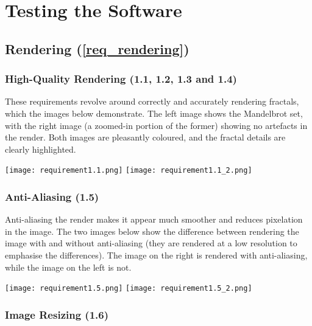 \section{Testing the Software}

\subsection{Rendering (\ref{req_rendering})}

\subsubsection{High-Quality Rendering (1.1, 1.2, 1.3 and 1.4)}

These requirements revolve around correctly and accurately rendering fractals, which the images below demonstrate. The left image shows the Mandelbrot set, with the right image (a zoomed-in portion of the former) showing no artefacts in the render. Both images are pleasantly coloured, and the fractal details are clearly highlighted.

\FloatBarrier
\begin{figure*}[htp]
	\centering
	\texttt{[image: requirement1.1.png]}
	\texttt{[image: requirement1.1\_2.png]}
\end{figure*}
\FloatBarrier

\subsubsection{Anti-Aliasing (1.5)}

Anti-aliasing the render makes it appear much smoother and reduces pixelation in the image. The two images below show the difference between rendering the image with and without anti-aliasing (they are rendered at a low resolution to emphasise the differences). The image on the right is rendered with anti-aliasing, while the image on the left is not.

\FloatBarrier
\begin{figure*}[htp]
	\centering
	\texttt{[image: requirement1.5.png]}
	\texttt{[image: requirement1.5\_2.png]}
\end{figure*}
\FloatBarrier

\subsubsection{Image Resizing (1.6)}

